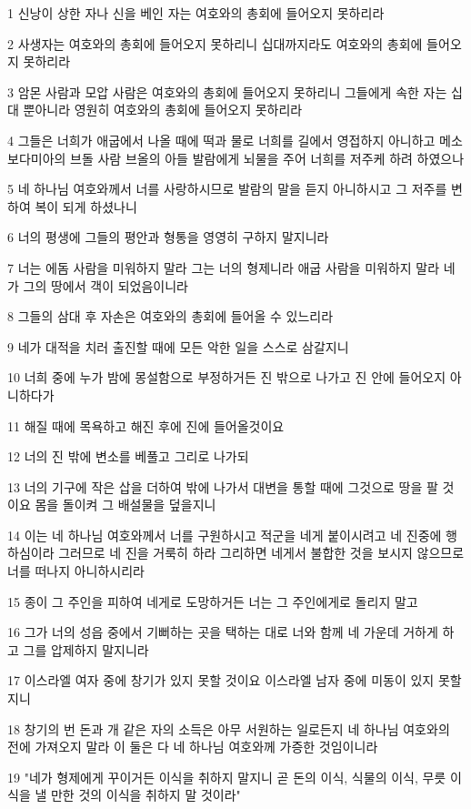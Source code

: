 \par 1 신낭이 상한 자나 신을 베인 자는 여호와의 총회에 들어오지 못하리라
\par 2 사생자는 여호와의 총회에 들어오지 못하리니 십대까지라도 여호와의 총회에 들어오지 못하리라
\par 3 암몬 사람과 모압 사람은 여호와의 총회에 들어오지 못하리니 그들에게 속한 자는 십대 뿐아니라 영원히 여호와의 총회에 들어오지 못하리라
\par 4 그들은 너희가 애굽에서 나올 때에 떡과 물로 너희를 길에서 영접하지 아니하고 메소보다미아의 브돌 사람 브올의 아들 발람에게 뇌물을 주어 너희를 저주케 하려 하였으나
\par 5 네 하나님 여호와께서 너를 사랑하시므로 발람의 말을 듣지 아니하시고 그 저주를 변하여 복이 되게 하셨나니
\par 6 너의 평생에 그들의 평안과 형통을 영영히 구하지 말지니라
\par 7 너는 에돔 사람을 미워하지 말라 그는 너의 형제니라 애굽 사람을 미워하지 말라 네가 그의 땅에서 객이 되었음이니라
\par 8 그들의 삼대 후 자손은 여호와의 총회에 들어올 수 있느리라
\par 9 네가 대적을 치러 출진할 때에 모든 악한 일을 스스로 삼갈지니
\par 10 너희 중에 누가 밤에 몽설함으로 부정하거든 진 밖으로 나가고 진 안에 들어오지 아니하다가
\par 11 해질 때에 목욕하고 해진 후에 진에 들어올것이요
\par 12 너의 진 밖에 변소를 베풀고 그리로 나가되
\par 13 너의 기구에 작은 삽을 더하여 밖에 나가서 대변을 통할 때에 그것으로 땅을 팔 것이요 몸을 돌이켜 그 배설물을 덮을지니
\par 14 이는 네 하나님 여호와께서 너를 구원하시고 적군을 네게 붙이시려고 네 진중에 행하심이라 그러므로 네 진을 거룩히 하라 그리하면 네게서 불합한 것을 보시지 않으므로 너를 떠나지 아니하시리라
\par 15 종이 그 주인을 피하여 네게로 도망하거든 너는 그 주인에게로 돌리지 말고
\par 16 그가 너의 성읍 중에서 기뻐하는 곳을 택하는 대로 너와 함께 네 가운데 거하게 하고 그를 압제하지 말지니라
\par 17 이스라엘 여자 중에 창기가 있지 못할 것이요 이스라엘 남자 중에 미동이 있지 못할지니
\par 18 창기의 번 돈과 개 같은 자의 소득은 아무 서원하는 일로든지 네 하나님 여호와의 전에 가져오지 말라 이 둘은 다 네 하나님 여호와께 가증한 것임이니라
\par 19 "네가 형제에게 꾸이거든 이식을 취하지 말지니 곧 돈의 이식, 식물의 이식, 무릇 이식을 낼 만한 것의 이식을 취하지 말 것이라"
